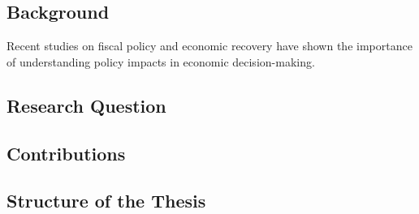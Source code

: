 \subsection{Background}
Recent studies on fiscal policy and economic recovery \citep{imf2023} have shown the importance of understanding policy impacts in economic decision-making.

\subsection{Research Question}

\subsection{Contributions}

\subsection{Structure of the Thesis}
